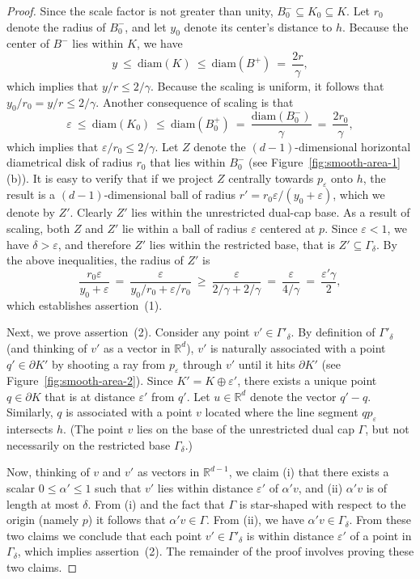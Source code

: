 \documentclass[11pt]{article}   \usepackage[letterpaper,hmargin=2.1cm,vmargin=3cm]{geometry}
\newcommand{\RE}{\mathbb{R}}    \newcommand{\ZZ}{\mathbb{Z}}    \newcommand{\eps}{\varepsilon}  \newcommand{\ST}{\,:\,}         \newcommand{\sq}{\square}
\newcommand{\diam}{\mathrm{diam}}
\begin{document}
\begin{proof}
Since the scale factor is not greater than unity, $B_0^- \subseteq K_0 \subseteq K$. Let $r_0$ denote the radius of $B_0^-$, and let  $y_0$ denote its center's distance to $h$. Because the center of $B^-$ lies within $K$, we have
\[
	y
		~ \le ~ \diam(K)
		~ \le ~ \diam(B^+)
		~  =  ~ \frac{2 r}{\gamma},
\]
which implies that $y/r \le 2/\gamma$. Because the scaling is uniform, it follows that $y_0/r_0 = y/r \le 2/\gamma$. Another consequence of scaling is that
\[
	\eps
		~ \le ~ \diam(K_0) 
		~ \le ~ \diam(B_0^+) 
		~  =  ~ \frac{\diam(B_0^-)}{\gamma} 
		~  =  ~ \frac{2 r_0}{\gamma},
\]
which implies that $\eps/r_0 \le 2/\gamma$. Let $Z$ denote the $(d-1)$-dimensional horizontal diametrical disk of radius $r_0$ that lies within $B_0^-$ (see Figure~\ref{fig:smooth-area-1}(b)). It is easy to verify that if we project $Z$ centrally towards $p_{\eps}$ onto $h$, the result is a $(d-1)$-dimensional ball of radius $r' = r_0 \eps/(y_0 + \eps)$, which we denote by $Z'$. Clearly $Z'$ lies within the unrestricted dual-cap base. As a result of scaling, both $Z$ and $Z'$ lie within a ball of radius $\eps$ centered at $p$. Since $\eps < 1$, we have $\delta > \eps$, and therefore $Z'$ lies within the restricted base, that is $Z' \subseteq \Gamma_{\delta}$. By the above inequalities, the radius of $Z'$ is
\[
	\frac{r_0 \eps}{y_0 + \eps}
		~  =  ~ \frac{\eps}{y_0/r_0 + \eps/r_0}
		~ \ge ~ \frac{\eps}{2/\gamma + 2/\gamma}
		~  =  ~ \frac{\eps}{4/\gamma}
		~  =  ~ \frac{\eps' \gamma}{2},
\]
which establishes assertion~(1).

Next, we prove assertion~(2). Consider any point $v' \in \Gamma'_{\delta}$. By definition of $\Gamma'_{\delta}$ (and thinking of $v'$ as a vector in $\RE^d$), $v'$ is naturally associated with a point $q' \in \partial K'$ by shooting a ray from $p_{\eps}$ through $v'$ until it hits $\partial K'$ (see Figure~\ref{fig:smooth-area-2}). Since $K' = K \oplus \eps'$, there exists a unique point $q \in \partial K$ that is at distance $\eps'$ from $q'$. Let $u \in \RE^d$ denote the vector $q' - q$. Similarly, $q$ is associated with a point $v$ located where the line segment $q p_{\eps}$ intersects $h$. (The point $v$ lies on the base of the unrestricted dual cap $\Gamma$, but not necessarily on the restricted base $\Gamma_{\delta}$.) 

Now, thinking of $v$ and $v'$ as vectors in $\RE^{d-1}$, we claim (i) that there exists a scalar $0 \le \alpha' \le 1$ such that $v'$ lies within distance $\eps'$ of $\alpha' v$, and (ii) $\alpha' v$ is of length at most $\delta$. From (i) and the fact that $\Gamma$ is star-shaped with respect to the origin (namely $p$) it follows that $\alpha' v \in \Gamma$. From (ii), we have $\alpha' v \in \Gamma_{\delta}$. From these two claims we conclude that each point $v' \in \Gamma'_{\delta}$ is within distance $\eps'$ of a point in $\Gamma_{\delta}$, which implies assertion~(2). The remainder of the proof involves proving these two claims.


\end{proof}
\end{document}
